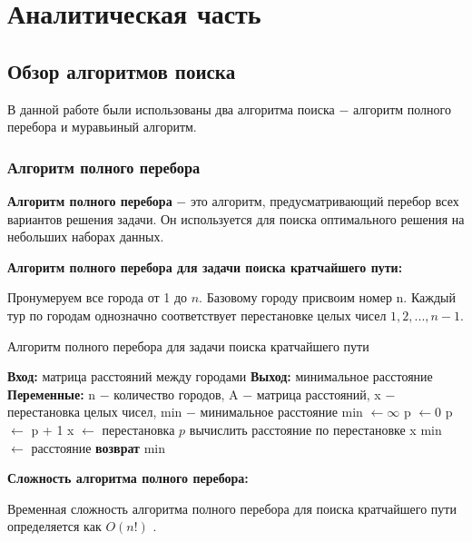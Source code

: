 \chapter{Аналитическая часть}

\section{Обзор алгоритмов поиска}

В данной работе были использованы два алгоритма поиска $-$ алгоритм полного перебора и муравьиный алгоритм.
\subsection{Алгоритм полного перебора}

\textbf{Алгоритм полного перебора} $-$ это алгоритм, предусматривающий перебор всех вариантов решения задачи. Он используется для поиска оптимального решения на небольших наборах данных.

\textbf{Алгоритм полного перебора для задачи поиска кратчайшего пути:}

Пронумеруем все города от 1 до $n$. Базовому городу присвоим номер n. 
Каждый тур по городам однозначно соответствует перестановке целых чисел $1, 2, ..., n-1$.


\begin{algorithm}
\caption{Алгоритм полного перебора для задачи поиска кратчайшего пути}
\label{alg:full_search}
\begin{algorithmic}[1]
\State \textbf{Вход:} матрица расстояний между городами
\State \textbf{Выход:} минимальное расстояние
\State \textbf{Переменные:} n $-$ количество городов, A $-$ матрица расстояний, x $-$ перестановка целых чисел, min $-$ минимальное расстояние
\State min $\leftarrow \infty$
\State p $\leftarrow 0$
		\State p $\leftarrow$ p + 1
		\State x $\leftarrow$ перестановка $p$
		\State вычислить расстояние по перестановке x
			\State min $\leftarrow$ расстояние
		\EndIf
	\EndFor
\EndFor
\State \textbf{возврат} min
\end{algorithmic}
\end{algorithm}

\textbf{Сложность алгоритма полного перебора:}

Временная сложность алгоритма полного перебора для поиска кратчайшего пути определяется как $O(n!)$ \cite{goodman}.

